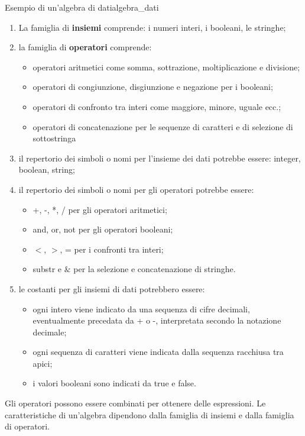 \documentclass[12pt]{report}
\newcommand{\nmu}{}
\begin{document}
	\begin{example}{\nmu Esempio di un'algebra di dati}{algebra_dati}
		\begin{enumerate}[label =- \Alph*)]
			\item La famiglia di \textbf{insiemi} comprende: i numeri interi, i booleani, le stringhe;
			\item la famiglia di \textbf{operatori} comprende:
			\begin{itemize}
				\item operatori aritmetici come somma, sottrazione, moltiplicazione e divisione;
				\item operatori di congiunzione, disgiunzione e negazione per i booleani;
				\item operatori di confronto tra interi come maggiore, minore, uguale ecc.;
				\item operatori di concatenazione per le sequenze di caratteri e di selezione di sottostringa
			\end{itemize}
			\item il repertorio dei simboli o nomi per l'insieme dei dati potrebbe essere: integer, boolean, string;
			\item il repertorio dei simboli o nomi per gli operatori potrebbe essere:
			\begin{itemize}
				\item +, -, *, / per gli operatori aritmetici;
				\item and, or, not per gli operatori booleani;
				\item $<$, $>$, = per i confronti tra interi;
				\item substr e $\&$ per la selezione e concatenazione di stringhe.
			\end{itemize}
			\item le costanti per gli insiemi di dati potrebbero essere:
			\begin{itemize}
				\item ogni intero viene indicato da una sequenza di cifre decimali, eventualmente precedata da + o -, interpretata secondo la notazione decimale;
				\item ogni sequenza di caratteri viene indicata dalla sequenza racchiusa tra apici;
				\item i valori booleani sono indicati da true e false.
			\end{itemize}
		\end{enumerate}
	\end{example}
	Gli operatori possono essere combinati per ottenere delle espressioni. Le caratteristiche di un'algebra dipendono dalla famiglia di insiemi e dalla famiglia di operatori. \\
\end{document}
